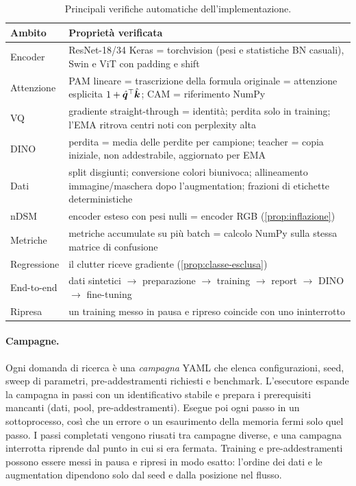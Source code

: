 \begin{table}[t]
  \centering
  \small
  \caption[Verifiche automatiche]{Principali verifiche automatiche dell'implementazione.}
  \label{tab:verifiche}
  \begin{tabular}{|l|p{9.6cm}|}
    \hline
    \textbf{Ambito} & \textbf{Proprietà verificata} \\
    \hline
    Encoder & ResNet-18/34 Keras = torchvision (pesi e statistiche BN casuali), Swin e ViT con padding e shift \\
    Attenzione & PAM lineare = trascrizione della formula originale = attenzione esplicita $1+\hat{\bm{q}}^{\top}\hat{\bm{k}}$; CAM = riferimento NumPy \\
    VQ & gradiente straight-through = identità; perdita solo in training; l'EMA ritrova centri noti con perplexity alta \\
    DINO & perdita = media delle perdite per campione; teacher = copia iniziale, non addestrabile, aggiornato per EMA \\
    Dati & split disgiunti; conversione colori biunivoca; allineamento immagine/maschera dopo l'augmentation; frazioni di etichette deterministiche \\
    nDSM & encoder esteso con pesi nulli = encoder RGB (\cref{prop:inflazione}) \\
    Metriche & metriche accumulate su più batch = calcolo NumPy sulla stessa matrice di confusione \\
    Regressione & il clutter riceve gradiente (\cref{prop:classe-esclusa}) \\
    End-to-end & dati sintetici $\to$ preparazione $\to$ training $\to$ report $\to$ DINO $\to$ fine-tuning \\
    Ripresa & un training messo in pausa e ripreso coincide con uno ininterrotto \\
    \hline
  \end{tabular}
\end{table}

\paragraph{Campagne.}
Ogni domanda di ricerca è una \emph{campagna} YAML che elenca configurazioni, seed, sweep di
parametri, pre-addestramenti richiesti e benchmark. L'esecutore espande la campagna in passi con
un identificativo stabile e prepara i prerequisiti mancanti (dati, pool, pre-addestramenti).
Esegue poi ogni passo in un sottoprocesso, così che un errore o un esaurimento della memoria
fermi solo quel passo. I passi completati vengono riusati tra campagne diverse, e una campagna
interrotta riprende dal punto in cui si era fermata. Training e pre-addestramenti possono essere
messi in pausa e ripresi in modo esatto: l'ordine dei dati e le augmentation dipendono solo dal
seed e dalla posizione nel flusso.

